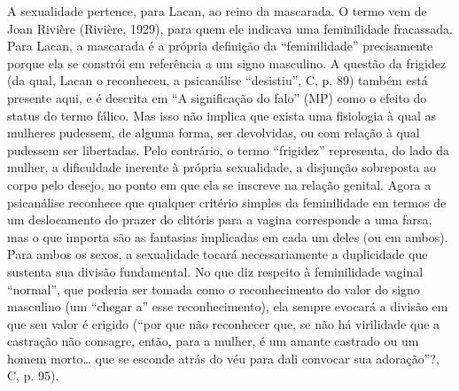 A sexualidade pertence, para Lacan, ao reino da mascarada. O termo vem
de Joan Rivière (Rivière, 1929), para quem ele indicava uma feminilidade
fracassada. Para Lacan, a mascarada é a própria definição da
``feminilidade'' precisamente porque ela se constrói em referência a um
signo masculino. A questão da frigidez (da qual, Lacan o reconheceu, a
psicanálise ``desistiu'', C, p. 89) também está presente aqui, e é
descrita em ``A significação do falo'' (MP) como o efeito do status do
termo fálico. Mas isso não implica que exista uma fisiologia à qual as
mulheres pudessem, de alguma forma, ser devolvidas, ou com relação à
qual pudessem ser libertadas. Pelo contrário, o termo ``frigidez''
representa, do lado da mulher, a dificuldade inerente à própria
sexualidade, a disjunção sobreposta ao corpo pelo desejo, no ponto em
que ela se inscreve na relação genital. Agora a psicanálise reconhece
que qualquer critério simples da feminilidade em termos de um
deslocamento do prazer do clitóris para a vagina corresponde a uma
farsa, mas o que importa são as fantasias implicadas em cada um deles
(ou em ambos). Para ambos os sexos, a sexualidade tocará necessariamente
a duplicidade que sustenta sua divisão fundamental. No que diz respeito
à feminilidade vaginal ``normal'', que poderia ser tomada como o
reconhecimento do valor do signo masculino (um ``chegar a'' esse
reconhecimento), ela sempre evocará a divisão em que seu valor é erigido
(``por que não reconhecer que, se não há virilidade que a castração não
consagre, então, para a mulher, é um amante castrado ou um homem
morto\ldots{} que se esconde atrás do véu para dali convocar sua adoração''?,
C, p. 95).

